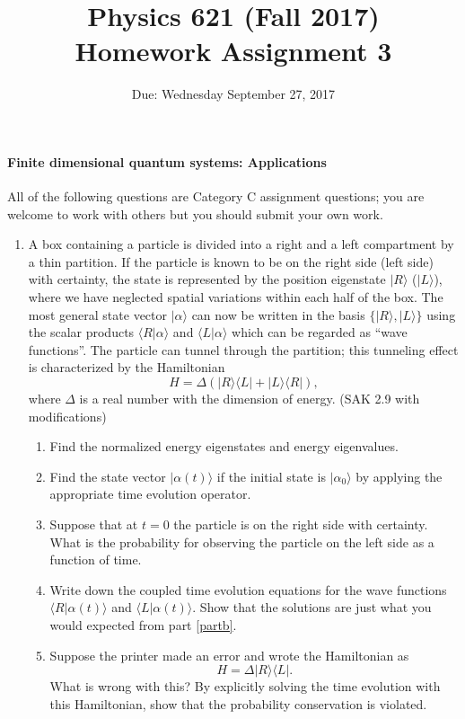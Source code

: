 \documentclass[letterpaper,11pt]{article}
\title{Physics 621 (Fall 2017) \\ Homework Assignment 3}
\date{Due: Wednesday September 27, 2017}
\begin{document}
\maketitle

\paragraph*{Finite dimensional quantum systems: Applications}

All of the following questions are Category C assignment questions; you are welcome to work with others but you should submit your own work.

\begin{enumerate}
  \item A box containing a particle is divided into a right and a left compartment by a thin partition. If the particle is known to be on the right side (left side) with certainty, the state is represented by the position eigenstate $|R\rangle$ ($|L\rangle$), where we have neglected spatial variations within each half of the box. The most general state vector $|\alpha\rangle$ can now be written in the basis $\{|R\rangle,|L\rangle\}$ using the scalar products $\langle R|\alpha\rangle$ and $\langle L|\alpha\rangle$ which can be regarded as ``wave functions''. The particle can tunnel through the partition; this tunneling effect is characterized by the Hamiltonian
  $$ H = \Delta ( |R\rangle \langle L| + |L\rangle \langle R| ), $$
  where $\Delta$ is a real number with the dimension of energy. (SAK 2.9 with modifications)
  \begin{enumerate}
    \item Find the normalized energy eigenstates and energy eigenvalues.
    \item \label{partb} Find the state vector $|\alpha(t)\rangle$ if the initial state is $|\alpha_0\rangle$ by applying the appropriate time evolution operator.
    \item Suppose that at $t = 0$ the particle is on the right side with certainty. What is the probability for observing the particle on the left side as a function of time.
    \item Write down the coupled time evolution equations for the wave functions $\langle R|\alpha(t)\rangle$ and $\langle L|\alpha(t)\rangle$. Show that the solutions are just what you would expected from part \ref{partb}.
    \item Suppose the printer made an error and wrote the Hamiltonian as
    $$ H = \Delta |R\rangle \langle L|. $$
    What is wrong with this? By explicitly solving the time evolution with this Hamiltonian, show that the probability conservation is violated.

\end{enumerate}
\end{enumerate}
\end{document}
